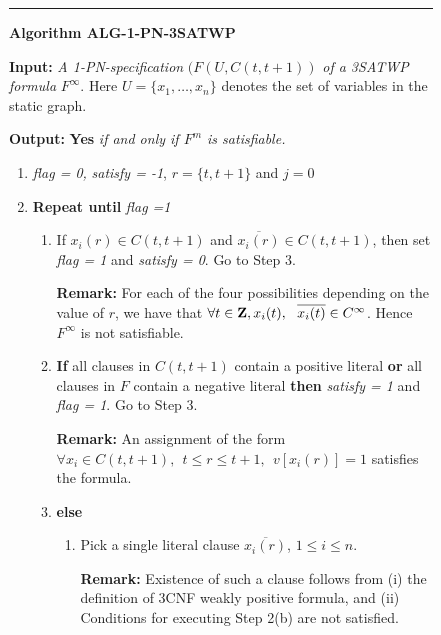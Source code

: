 \smallspacing
{\small
\begin{figure}[tbp]
\rule{\textwidth}{0.01in}

\noindent
{\bf Algorithm ALG-1-PN-3SATWP} 

\noindent
{\bf Input:} {\it A 1-PN-specification} $(F(U,C(t, t+1))$
{\it of a 3SATWP formula } $F^{\infty}$.  Here $U = \{ x_1, \ldots, x_n \}$
denotes the set of variables in the static graph.

\noindent
{\bf Output:} {\bf Yes} {\it if and only if $F^m$  is satisfiable.} 

\begin{enumerate}

\item
{\em flag = 0,} {\em satisfy = -1}, $r = \{ t, t+1 \}$ and $ j = 0$
\item
{\bf Repeat until} {\em flag =1 }

\begin{enumerate}

\item
If $x_i(r) \in C(t, t+1)$  and $\overline{x_i(r)} \in C(t, t+1)$, 
then set {\em flag = 1} and {\em satisfy = 0}. Go to Step 3.

\noindent
{\bf Remark:} 
For each of the four possibilities depending on the value of $r$, we have
that $\forall t \in {\bf Z}, x_i(t), ~~ \overline{x_i(t)} \in C^{\infty}$.
Hence $F^{\infty}$ is not satisfiable.



\item
{\bf If} all clauses in $C(t,t+1)$ contain a positive literal {\bf or}
all clauses in $F$ contain a negative literal {\bf then} {\em satisfy = 1}
and {\em flag = 1}. Go to Step 3.

\noindent
{\bf Remark:} 
An assignment of the form 
$\forall x_i \in C(t, t+1), ~~ t \leq r \leq t+1, ~~   v[x_i(r)] = 1$ 
satisfies the formula.

\item 
{\bf else}

\begin{enumerate}



\item
Pick a single literal clause $\overline{x_i(r)}$, $1 \leq i \leq n$.


\noindent
{\bf Remark:} Existence of such a clause follows from 
(i) the definition of 3CNF weakly positive formula, and 
(ii) Conditions for executing Step 2(b) are not satisfied.




\end{enumerate}
\end{enumerate}
\end{enumerate}
\end{figure}}
